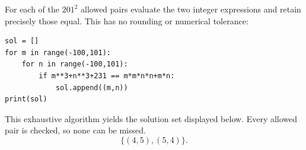 For each of the $201^2$ allowed pairs evaluate the two integer expressions and retain precisely those equal. This has no rounding or numerical tolerance:
\begin{verbatim}
sol = []
for m in range(-100,101):
    for n in range(-100,101):
        if m**3+n**3+231 == m*m*n*n+m*n:
            sol.append((m,n))
print(sol)
\end{verbatim}
This exhaustive algorithm yields the solution set displayed below. Every allowed pair is checked, so none can be missed.
\[\boxed{\{(4, 5),(5, 4)\}}.\]
